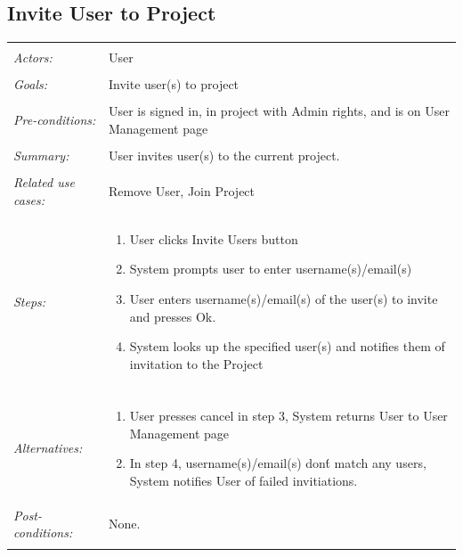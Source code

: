 \documentclass[11pt]{report}
\begin{document}
\subsection{Invite User to Project}
\begin{tabular}{ p{2cm} p{12cm} }
    \hline
    \\
    \textit{Actors:} & User \\ 
    \\
    \textit{Goals:} & Invite user(s) to project \\
    \\
    \textit{Pre-conditions:} & User is signed in, in project with Admin rights, and is on User Management page \\
    \\
    \textit{Summary:} & User invites user(s) to the current project. \\ 
    \\
    \textit{Related use cases:} & Remove User, Join Project \\ 
    \\
    \textit{Steps:} & \begin{enumerate}
        \item User clicks Invite Users button
        \item System prompts user to enter username(s)/email(s)
        \item User enters username(s)/email(s) of the user(s) to invite and presses Ok.
        \item System looks up the specified user(s) and notifies them of invitation to the Project
    \end{enumerate} \\
    \\
    \textit{Alternatives:} & \begin{enumerate}
        \item User presses cancel in step 3, System returns User to User Management page
        \item In step 4, username(s)/email(s) don\'t match any users, System notifies User of failed invitiations.
    \end{enumerate} 
    \\
    \textit{Post-conditions:} & None. \\
    \\
    \hline
\end{tabular}
\end{document}
